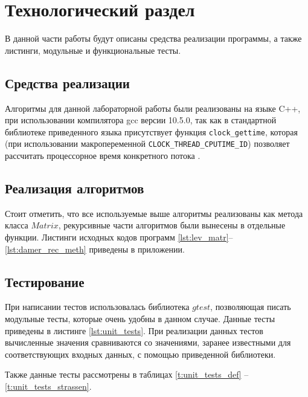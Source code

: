 \chapter{Технологический раздел}

В данной части работы будут описаны средства реализации программы, а также листинги, модульные и функциональные тесты.

\section{Средства реализации}
Алгоритмы для данной лабораторной работы были реализованы на языке C++, при использовании компилятора gcc версии 10.5.0, так как в стандартной библиотеке приведенного языка
присутствует функция \texttt{clock\_gettime}, которая (при использовании макропеременной \texttt{CLOCK\_THREAD\_CPUTIME\_ID}) позволяет рассчитать процессорное время конкретного потока \cite{cpp-time}.



\section{Реализация алгоритмов}

Стоит отметить, что все используемые выше алгоритмы реализованы как метода класса $Matrix$, рекурсивные части алгоритмов были вынесены в отдельные функции.
Листинги исходных кодов программ  \ref{lst:lev_matr}--\ref{lst:damer_rec_meth} приведены в приложении.

\section{Тестирование}
При написании тестов использовалась библиотека $gtest$, позволяющая писать модульные тесты, которые очень удобны 
в данном случае. Данные тесты приведены в листинге  \ref{lst:unit_tests}. При реализации данных тестов вычисленные значения
сравниваются со значениями, заранее известными для соответствующих входных данных, с помощью приведенной библиотеки.


Также данные тесты рассмотрены в таблицах \ref{t:unit_tests_def} -- \ref{t:unit_tests_strassen}.

